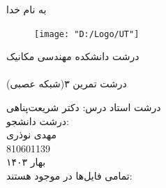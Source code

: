 \documentclass[11pt]{article}
\begin{document}
	به نام خدا\\
	\vspace{1cm}
	\begin{figure}[h]
		\begin{center}
			\texttt{[image: "D:/Logo/UT"]}
		\end{center}
	\end{figure}
	{‌درشت دانشکده مهندسی مکانیک}\\
	\vspace{1cm}
	{ }\\
	
	\vspace{0.5cm}
	{‌درشت تمرین ۳(شبکه عصبی)}
	\vspace{1.5cm}
	
	\vspace{1.5cm}
	{‌درشت { استاد درس:} دکتر شریعت‌پناهی}\\
	\vspace{2cm}
	{‌درشت { دانشجو:}}\\
	{ مهدی نوذری\\
	810601139}\\
	\vspace{3cm}
	بهار ۱۴۰۳\\
	\pagebreak
		تمامی فایل‌ها در  موجود هستند:
	\href{https://github.com/Morphit/UT_AI_1403}{}
\end{document}
